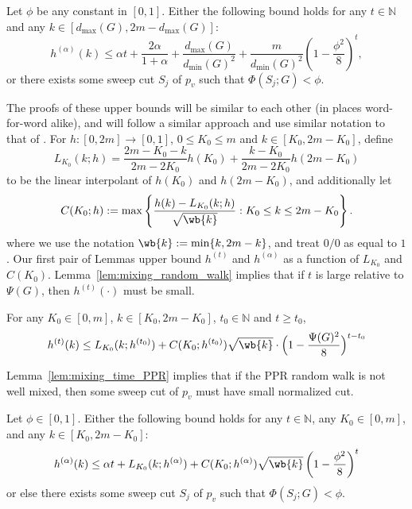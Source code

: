 \documentclass[twoside,11pt]{article}
\newcommand{\set}[1]{\left\{#1\right\}}
\newcommand{\1}{\mathbf{1}}
\begin{document}
\begin{theorem}
	\label{thm:mixing_time_PPR}
	Let $\phi$ be any constant in $[0,1]$. Either the following bound holds for any $t \in \mathbb{N}$ and any $k \in [d_{\max}(G),2m - d_{\max}(G)]$:
	\begin{equation*}
	h^{(\alpha)}(k) \leq \alpha t + \frac{2\alpha}{1 + \alpha} + \frac{d_{\max}(G)}{d_{\min}(G)^2} + \frac{m}{d_{\min}(G)^2} \left(1 - \frac{\phi^2}{8}\right)^{t},
	\end{equation*}
	or there exists some sweep cut $S_j$ of $p_v$ such that $\Phi(S_j;G) < \phi$.
\end{theorem}

The proofs of these upper bounds will be similar to each other (in places word-for-word alike), and will follow a similar approach and use similar notation to that of \citep{lovasz1990,andersen2006}. For $h: [0,2m] \to [0,1]$, $0 \leq K_0 \leq m$ and $k \in [K_0,2m - K_0]$, define
\begin{equation*}
L_{K_0}(k;h) = \frac{2m - K_0 - k}{2m - 2K_0}h(K_0) + \frac{k - K_0}{2m - 2K_0}h(2m - K_0)
\end{equation*}
to be the linear interpolant of $h(K_0)$ and $h(2m - K_0)$, and additionally let
\begin{equation*}
C(K_0;h) := \max\set{\frac{h(k) - L_{K_0}(k;h)}{\sqrt{\wb{k}}}: K_0 \leq k \leq  2m - K_0}.
\end{equation*}
where we use the notation $\wb{k} := \min\{k, 2m - k\}$, and treat $0/0$ as equal to $1$. Our first pair of Lemmas upper bound $h^{(t)}$ and $h^{(\alpha)}$ as a function of $L_{K_0}$ and $C(K_0)$. Lemma~\ref{lem:mixing_random_walk} implies that if $t$ is large relative to $\Psi(G)$, then $h^{(t)}(\cdot)$ must be small.

\begin{lemma}
	\label{lem:mixing_random_walk}
	For any $K_0 \in [0,m]$, $k \in [K_0, 2m - K_0]$, $t_0 \in \mathbb{N}$ and $t \geq t_0$,
	\begin{equation}
	\label{eqn:mixing_random_walk}
	h^{(t)}(k) \leq L_{K_0}(k;h^{(t_0)}) + C(K_0; h^{(t_0)}) \sqrt{\wb{k}} \cdot \Bigl(1 - \frac{\Psi(G)^2}{8}\Bigr)^{t - t_0}
	\end{equation}
\end{lemma}

Lemma~\ref{lem:mixing_time_PPR} implies that if the PPR random walk is not well mixed, then some sweep cut of $p_v$ must have small normalized cut.

\begin{lemma}
	\label{lem:mixing_time_PPR}
	Let $\phi \in [0,1]$. Either the following bound holds for any $t \in \mathbb{N}$, any $K_0 \in [0,m]$, and any $k \in [K_0,2m - K_0]$:
	\begin{equation}
	\label{eqn:mixing_time_PPR}
	h^{(\alpha)}(k) \leq \alpha t + L_{K_0}(k; h^{(\alpha)}) + C(K_0;h^{(\alpha)})\sqrt{\wb{k}}\left(1 - \frac{\phi^2}{8}\right)^t
	\end{equation}
	or else there exists some sweep cut $S_{j}$ of $p_v$ such that $\Phi(S_j;G) < \phi$.
\end{lemma}
\end{document}
